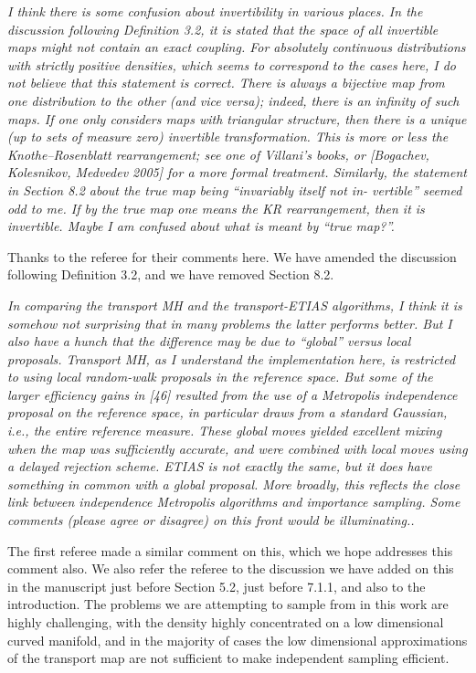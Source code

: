 \documentclass{article}
\newcommand{\comment}[2]{\vspace{0.6cm}{\bf Comment:} {\it #1.}

\vspace{0.3cm}{\bf Answer:} #2}
\begin{document}

\comment{I think there is some confusion about invertibility in various places.
In the discussion following Definition 3.2, it is stated that the space of all invertible maps might not contain an exact coupling. For absolutely continuous distributions with strictly positive densities, which seems to correspond to the cases here, I do not believe that this statement is correct. There is always a bijective map from one distribution to the other (and vice versa); indeed, there is an infinity of such maps. If one only considers maps with triangular structure, then there is a unique (up to sets of measure zero) invertible transformation. This is more or less the Knothe–Rosenblatt rearrangement; see one of Villani’s books, or [Bogachev, Kolesnikov, Medvedev 2005] for a more formal treatment.
Similarly, the statement in Section 8.2 about the true map being “invariably itself not in- vertible” seemed odd to me. If by the true map one means the KR rearrangement, then it is invertible. Maybe I am confused about what is meant by “true map?”}{Thanks to the referee for their comments here. We have amended the discussion following Definition 3.2, and we have removed Section 8.2.}


\comment{ In comparing the transport MH and the transport-ETIAS algorithms, I think it is somehow not surprising that in many problems the latter performs better. But I also have a hunch that the difference may be due to “global” versus local proposals. Transport MH, as I understand the implementation here, is restricted to using local random-walk proposals in the reference space. But some of the larger efficiency gains in [46] resulted from the use of a Metropolis independence proposal on the reference space, in particular draws from a standard Gaussian, i.e., the entire reference measure. These global moves yielded excellent mixing when the map was sufficiently accurate, and were combined with local moves using a delayed rejection scheme. ETIAS is not exactly the same, but it does have something in common with a global proposal. More broadly, this reflects the close link between independence Metropolis algorithms and importance sampling. Some comments (please agree or disagree) on this front would be illuminating.}{The first referee made a similar comment on this, which we hope addresses this comment also. We also refer the referee to the discussion we have added on this in the manuscript just before Section 5.2, just before 7.1.1, and also to the introduction. The problems we are attempting to sample from in this work are highly challenging, with the density highly concentrated on a low dimensional curved manifold, and in the majority of cases the low dimensional approximations of the transport map are not sufficient to make independent sampling efficient.}
\end{document}
